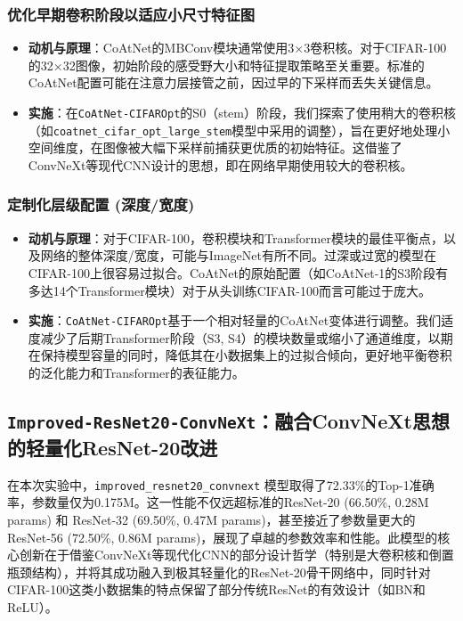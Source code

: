 \documentclass[a4paper]{article}
\begin{document}
\begin{description}
\subsubsection{优化早期卷积阶段以适应小尺寸特征图}
\begin{itemize}
    \item \textbf{动机与原理}：CoAtNet的MBConv模块通常使用3×3卷积核。对于CIFAR-100的32×32图像，初始阶段的感受野大小和特征提取策略至关重要。标准的CoAtNet配置可能在注意力层接管之前，因过早的下采样而丢失关键信息。
    \item \textbf{实施}：在\texttt{CoAtNet-CIFAROpt}的S0（stem）阶段，我们探索了使用稍大的卷积核（如\texttt{coatnet\_cifar\_opt\_large\_stem}模型中采用的调整），旨在更好地处理小空间维度，在图像被大幅下采样前捕获更优质的初始特征。这借鉴了ConvNeXt等现代CNN设计的思想，即在网络早期使用较大的卷积核。
\end{itemize}

\subsubsection{定制化层级配置 (深度/宽度)}
\begin{itemize}
    \item \textbf{动机与原理}：对于CIFAR-100，卷积模块和Transformer模块的最佳平衡点，以及网络的整体深度/宽度，可能与ImageNet有所不同。过深或过宽的模型在CIFAR-100上很容易过拟合。CoAtNet的原始配置（如CoAtNet-1的S3阶段有多达14个Transformer模块）对于从头训练CIFAR-100而言可能过于庞大。
    \item \textbf{实施}：\texttt{CoAtNet-CIFAROpt}基于一个相对轻量的CoAtNet变体进行调整。我们适度减少了后期Transformer阶段（S3, S4）的模块数量或缩小了通道维度，以期在保持模型容量的同时，降低其在小数据集上的过拟合倾向，更好地平衡卷积的泛化能力和Transformer的表征能力。
\end{itemize}

\subsection{\texttt{Improved-ResNet20-ConvNeXt}：融合ConvNeXt思想的轻量化ResNet-20改进}

在本次实验中，\texttt{improved\_resnet20\_convnext} 模型取得了72.33\%的Top-1准确率，参数量仅为0.175M。这一性能不仅远超标准的ResNet-20 (66.50\%, 0.28M params) 和 ResNet-32 (69.50\%, 0.47M params)，甚至接近了参数量更大的ResNet-56 (72.50\%, 0.86M params)，展现了卓越的参数效率和性能。此模型的核心创新在于借鉴ConvNeXt等现代化CNN的部分设计哲学（特别是大卷积核和倒置瓶颈结构），并将其成功融入到极其轻量化的ResNet-20骨干网络中，同时针对CIFAR-100这类小数据集的特点保留了部分传统ResNet的有效设计（如BN和ReLU）。


\end{description}
\end{document}
